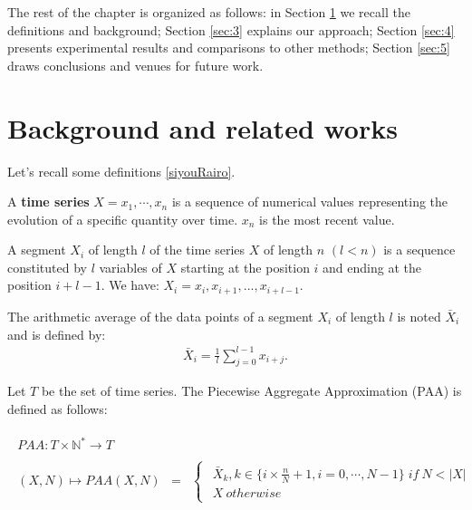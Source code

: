 The rest of the chapter is organized as follows: in Section
\ref{sec:1} we recall the definitions and background; Section \ref{sec:3} explains our approach;
Section \ref{sec:4} presents experimental results and comparisons to other methods; Section
\ref{sec:5} draws conclusions and venues for future work.   




\section{Background and related works}
\label{sec:1}
Let's recall some definitions \ref{siyouRairo}.

\begin{definition}
A \textbf{time series}
$X=x_{1},\cdots,x_{n}$ is a sequence of numerical values representing the evolution of a specific quantity over time. $x_{n}$ is the most recent value.
\end{definition}

\begin{definition}
A segment  $X_{i}$ of length  $l$ of the time series $X$ of length $n$
$(l<n)$ is a sequence constituted by $l$  variables of $X$ starting at the position $i$ and ending at the position $i+l-1$.
We have: $X_{i}=x_{i},x_{i+1},...,x_{i+l-1}$.
\end{definition}

\begin{definition}
The arithmetic average of the data points of a segment  $X_{i}$ of length
$l$ is noted $\bar{X}_{i}$ and is defined by:
\begin{eqnarray}
\bar{X}_{i}=\frac{1}{l}\sum_{j=0}^{l-1}x_{i+j}.
\end{eqnarray}
\end{definition}


\begin{definition}

Let $T$ be the set of time series. The Piecewise Aggregate Approximation (PAA) is defined as follows:

\begin{eqnarray}
\begin{array}{ccc}
 PAA: T\times\mathbb{N^{*}}\rightarrow T\\
\\
(X,N)\mapsto PAA(X,N) & = &
 \begin{cases}
 \begin{array}{c}
\bar{X}_{k}, k \in \{i\times\frac{n}{N} + 1, i=0,\cdots , N-1\}\;if\:N<|X|\\
X\:otherwise
\end{array}
\end{cases}
\end{array}
\end{eqnarray}

\end{definition}


